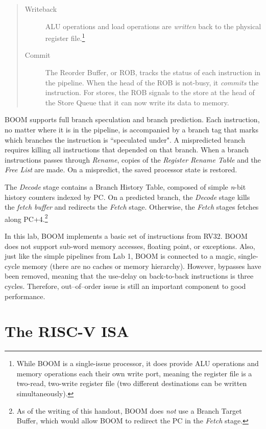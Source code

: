 \begin{quote}
\begin{description}
\item[Writeback]  ALU operations and load operations are {\em written} back to the physical register file.\footnote{While BOOM is a single-issue processor, it does provide ALU operations and memory operations each their own write port, meaning the register file is a two-read, two-write register file (two different destinations can be written simultaneously).}  
\item[Commit] The Reorder Buffer, or ROB, tracks the status of each instruction in the pipeline.  When the head of the ROB is not-busy, it {\em commits} the instruction.  For stores, the ROB signals to the store at the head of the Store Queue that it can now write its data to memory.
\end{description}
\end{quote}


  
BOOM supports full branch speculation and branch prediction.  Each instruction, no matter where it is in the pipeline,  is accompanied by a branch tag that marks which branches the instruction is ``speculated under". A mispredicted branch requires killing all instructions that depended on that branch.  When a branch instructions passes through {\em Rename}, copies of the {\em Register Rename Table} and the {\em Free List} are made.  On a mispredict, the saved processor state is restored.

 The {\em Decode} stage contains a Branch History Table, composed of simple {\em n}-bit history counters indexed by PC.  On a predicted branch, the {\em Decode} stage kills the {\em fetch buffer} and redirects the {\em Fetch} stage.  Otherwise, the {\em Fetch} stages fetches along PC+4.\footnote{As of the writing of this handout, BOOM does {\em not} use a Branch Target Buffer, which would allow BOOM to redirect the PC in the {\em Fetch} stage.}  

In this lab, BOOM implements a basic set of instructions from RV32.  BOOM does not support sub-word memory accesses, floating point, or exceptions.  Also, just like the simple pipelines from Lab 1, BOOM is connected to a magic, single-cycle memory (there are no caches or memory hierarchy).  However, bypasses have been removed, meaning that the use-delay on back-to-back instructions is three cycles.  Therefore, out--of--order issue is still an important component to good performance.  



\section{The RISC-V ISA}

